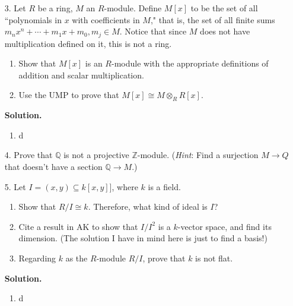 \documentclass[9pt]{article}
\newcommand{\Z}{\mathbb{Z}}
\newcommand{\Q}{\mathbb{Q}}
\begin{document}
\begin{enumerate}
   \item[3.]   Let $R$ be a ring, $M$ an $R$-module. Define $M[x]$ to be the set
               of all ``polynomials in $x$ with coefficients in $M$," that is,
               the set of all finite sums
               $m_nx^n + \cdots + m_1x + m_0, m_j \in M$. Notice that since $M$
               does not have multiplication defined on it, this is not a ring.
               \begin{enumerate}
                  \item Show that $M[x]$ is an $R$-module with the appropriate
                        definitions of addition and scalar multiplication.
                  \item Use the UMP to prove that $M[x] \cong M \otimes_R R[x]$.
               \end{enumerate}

      \textbf{Solution.}
      
      \begin{enumerate}
         \item d
      \end{enumerate}
   \item[4.]   Prove that $\Q$ is not a projective $\Z$-module. (\textit{Hint}:
               Find a surjection $M \rightarrow Q$ that doesn't have a section
               $\Q \rightarrow M$.)
   \item[5.]   Let $I = (x, y) \subseteq k[x, y]]$, where $k$ is a field.
               \begin{enumerate}
                  \item Show that $R/I \cong k$. Therefore, what kind of ideal
                        is $I$?
                  \item Cite a result in AK to show that $I/I^2$ is a $k$-vector
                        space, and find its dimension. (The solution I have in
                        mind here is just to find a basis!)
                  \item Regarding $k$ as the $R$-module $R/I$, prove that $k$ is
                        not flat.
               \end{enumerate}

      \textbf{Solution.}
      
      \begin{enumerate}
         \item d
      \end{enumerate}
\end{enumerate}
\end{document}
